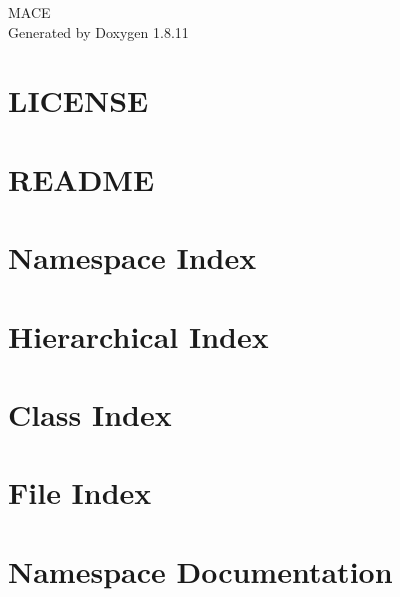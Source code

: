 \documentclass[twoside]{book}
\newcommand{\+}{\discretionary{\mbox{\scriptsize$\hookleftarrow$}}{}{}}
\newcommand{\clearemptydoublepage}{%
  \newpage{\pagestyle{empty}\cleardoublepage}%
}
\begin{document}
\hypersetup{pageanchor=false,
             bookmarksnumbered=true,
             pdfencoding=unicode
            }
\begin{titlepage}
\vspace*{7cm}
\begin{center}%
{\Large M\+A\+CE }\\
\vspace*{1cm}
{\large Generated by Doxygen 1.8.11}\\
\end{center}
\end{titlepage}
\clearemptydoublepage
\tableofcontents
\clearemptydoublepage
{}
\hypersetup{pageanchor=true}

\chapter{L\+I\+C\+E\+N\+SE}
\label{md_D:_Workspace_MACE_LICENSE}
\hypertarget{md_D:_Workspace_MACE_LICENSE}{}

\chapter{R\+E\+A\+D\+ME}
\label{md_D:_Workspace_MACE_README}
\hypertarget{md_D:_Workspace_MACE_README}{}

\chapter{Namespace Index}

\chapter{Hierarchical Index}

\chapter{Class Index}

\chapter{File Index}

\chapter{Namespace Documentation}

\end{document}
